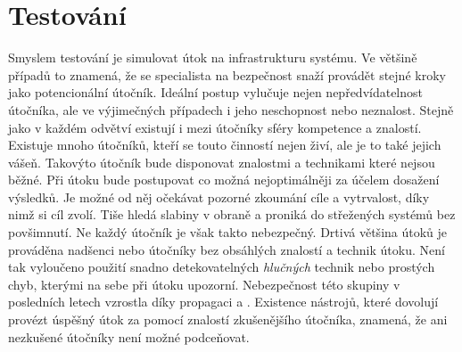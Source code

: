 \section{Testování}\label{sec:testovani}
Smyslem testování je simulovat útok na infrastrukturu systému.
Ve většině případů to znamená, že se specialista na bezpečnost snaží provádět stejné kroky jako potencionální útočník.
Ideální postup vylučuje nejen nepředvídatelnost útočníka, ale ve výjimečných případech i jeho neschopnost nebo neznalost.
Stejně jako v každém odvětví existují i mezi útočníky sféry kompetence a znalostí.
Existuje mnoho útočníků, kteří se touto činností nejen živí, ale je to také jejich vášeň.
Takovýto útočník bude disponovat znalostmi a technikami které nejsou běžné.
Při útoku bude postupovat co možná nejoptimálněji za účelem dosažení výsledků.
Je možné od něj očekávat pozorné zkoumání cíle a vytrvalost, díky nimž si cíl zvolí.
Tiše hledá slabiny v obraně a proniká do střežených systémů bez povšimnutí.
Ne každý útočník je však takto nebezpečný.
Drtivá většina útoků je prováděna nadšenci nebo útočníky bez obsáhlých znalostí a technik útoku.
Není tak vyloučeno použití snadno detekovatelných \textit{hlučných} technik nebo prostých chyb, kterými na sebe při útoku upozorní.
Nebezpečnost této skupiny v posledních letech vzrostla díky propagaci \cite{MaaS_ATaT} a \cite{RaaS_microsoft}.
Existence nástrojů, které dovolují provézt úspěšný útok za pomocí znalostí zkušenějšího útočníka, znamená, že ani nezkušené útočníky není možné podceňovat.


